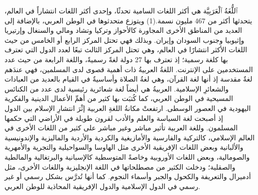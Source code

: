 \documentclass[a4paper,12pt,oneside,final]{article}
\begin{document}
ٱللُّغَةُ ٱلْعَرَبِيَّة هي أكثر اللغات السامية تحدثًا، وإحدى أكثر اللغات انتشاراً في العالم، يتحدثها أكثر من 467 مليون نسمة.(1) ويتوزع متحدثوها في الوطن العربي، بالإضافة إلى العديد من المناطق الأخرى المجاورة كالأحواز وتركيا وتشاد ومالي والسنغال وإرتيريا وإثيوبيا وجنوب السودان وإيران. وبذلك فهي تحتل المركز الرابع أو الخامس من حيث اللغات الأكثر انتشارًا في العالم، وهي تحتل المركز الثالث تبعًا لعدد الدول التي تعترف بها كلغة رسمية؛ إذ تعترف بها 27 دولة لغةً رسميةً، واللغة الرابعة من حيث عدد المستخدمين على الإنترنت. اللغةُ العربيةُ ذات أهمية قصوى لدى المسلمين، فهي عندَهم لغةٌ مقدسة إذ أنها لغة القرآن، وهي لغةُ الصلاة وأساسيةٌ في القيام بالعديد من العبادات والشعائرِ الإسلامية. العربيةُ هي أيضاً لغة شعائرية رئيسية لدى عدد من الكنائس المسيحية في الوطن العربي، كما كُتبَت بها كثير من أهمِّ الأعمال الدينية والفكرية اليهودية في العصور الوسطى. ارتفعتْ مكانةُ اللغةِ العربية إثْرَ انتشارِ الإسلام بين الدول إذ أصبحت لغة السياسة والعلم والأدب لقرون طويلة في الأراضي التي حكمها المسلمون. وللغة العربية تأثير مباشر وغير مباشر على كثير من اللغات الأخرى في العالم الإسلامي، كالتركية والفارسية والأمازيغية والكردية والأردية والماليزية والإندونيسية والألبانية وبعض اللغات الإفريقية الأخرى مثل الهاوسا والسواحيلية والتجرية والأمهرية والصومالية، وبعض اللغات الأوروبية وخاصةً المتوسطية كالإسبانية والبرتغالية والمالطية والصقلية؛ ودخلت الكثير من مصطلحاتها في اللغة الإنجليزية واللغات الأخرى، مثل أدميرال والتعريفة والكحول والجبر وأسماء النجوم. كما أنها تُدرَّس بشكل رسمي أو غير رسمي في الدول الإسلامية والدول الإفريقية المحاذية للوطن العربي.
\end{document}
